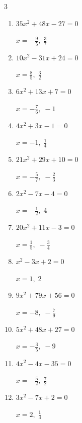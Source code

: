 \begin{multicols}{3}
\begin{enumerate}
        $\displaystyle x=\frac{8}{9},\; -\frac{5}{3}$

\columnbreak %

  \item $35x^{2}+48x-27=0$

        $\displaystyle x=-\frac{9}{5},\; \frac{3}{7}$

  \item $10x^{2}-31x+24=0$

        $\displaystyle x=\frac{8}{5},\; \frac{3}{2}$

  \item $6x^{2}+13x+7=0$

        $\displaystyle x=-\frac{7}{6},\; -1$

  \item $4x^{2}+3x-1=0$

        $\displaystyle x=-1,\; \frac{1}{4}$

  \item $21x^{2}+29x+10=0$

        $\displaystyle x=-\frac{5}{7},\; -\frac{2}{3}$

  \item $2x^{2}-7x-4=0$

        $\displaystyle x=-\frac{1}{2},\; 4$

  \item $20x^{2}+11x-3=0$

        $\displaystyle x=\frac{1}{5},\; -\frac{3}{4}$

  \item $x^{2}-3x+2=0$

        $\displaystyle x=1,\; 2$

  \item $9x^{2}+79x+56=0$

        $\displaystyle x=-8,\; -\frac{7}{9}$

  \item $5x^{2}+48x+27=0$

        $\displaystyle x=-\frac{3}{5},\; -9$

\columnbreak %

\resetques

  \item $4x^{2}-4x-35=0$

        $\displaystyle x=-\frac{5}{2},\; \frac{7}{2}$

  \item $3x^{2}-7x+2=0$

        $\displaystyle x=2,\; \frac{1}{3}$


\end{enumerate}
\end{multicols}
